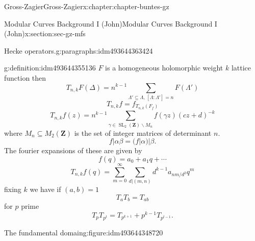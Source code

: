 \documentclass[oneside,10pt,]{book}
\numberwithin{equation}{section}
\newcommand{\ZZ}{\mathbf{Z}}
\DeclareMathOperator{\SL}{SL}
\begin{document}
\begin{chapterptx}{Gross-Zagier}{}{Gross-Zagier}{}{}{x:chapter:chapter-buntes-gz}
\begin{sectionptx}{Modular Curves Background I (John)}{}{Modular Curves Background I (John)}{}{}{x:section:sec-gz-mfs}
\begin{paragraphs}{Hecke operators.}{g:paragraphs:idm493644363424}
\begin{definition}{}{g:definition:idm493644355136}
\(F\) is a homogeneous holomorphic weight \(k\) lattice function then%
\begin{equation*}
T_{n,k} F(\Delta ) = n^{k-1} \sum_{\Lambda ' \subseteq \Lambda ,\,[\Lambda : \Lambda '] = n} F(\Lambda ')
\end{equation*}
%
\begin{equation*}
T_{n,k}f = f_{T_{n,k}(F_f)}
\end{equation*}
%
\begin{equation*}
T_{n,k} f(z) = n^{k-1} \sum_{\gamma \in \SL_2(\ZZ)\backslash  M_n } f(\gamma  z)(cz+d)^{-k}
\end{equation*}
where \(M_n \subseteq  M_2(\ZZ)\) is the set of integer matrices of determinant \(n\).%
\begin{equation*}
f|\alpha \beta = (f|\alpha )|\beta \text{.}
\end{equation*}
The fourier expansions of these are given by%
\begin{equation*}
f(q) = a_0 + a_1 q + \cdots
\end{equation*}
%
\begin{equation*}
T_{n,k}f(q) = \sum_{m = 0}^\infty \sum_{d|(m,n)} d^{k-1} a_{nm/d^2} q^m
\end{equation*}
fixing \(k\) we have if \((a,b) = 1\)%
\begin{equation*}
T_aT_b = T_{ab}
\end{equation*}
for \(p \) prime%
\begin{equation*}
T_p T_{p^t} = T_{p^{k+1}} + p^{k-1} T_{p^{t-1}}\text{.}
\end{equation*}
%
\end{definition}
\begin{figureptx}{The fundamental domain}{g:figure:idm493644348720}{}%
\begin{image}{0}{1}{0}%
\end{image}
\end{figureptx}
\end{paragraphs}
\end{sectionptx}
\end{chapterptx}
\end{document}
